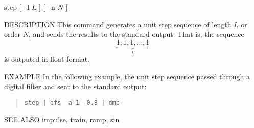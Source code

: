 
\begin{synopsis}
\item[step] [ --l $L$ ] [ --n $N$ ]
\end{synopsis}

\begin{qsection}{DESCRIPTION}
This command generates a unit step sequence of length $L$ or order $N$,
and sends the results to the standard output.
That is, the sequence 
\begin{displaymath}
\underbrace{1, 1, 1, \ldots, 1}_{L}
\end{displaymath}
is outputed in float format.
\end{qsection}

\begin{options}
\end{options}

\begin{qsection}{EXAMPLE}
In the following example, the unit step sequence passed through
a digital filter and sent to the standard output:
\begin{quote}
\verb!step | dfs -a 1 -0.8 | dmp!
\end{quote}
\end{qsection}

\begin{qsection}{SEE ALSO}
  impulse, train, ramp, sin
\end{qsection}
